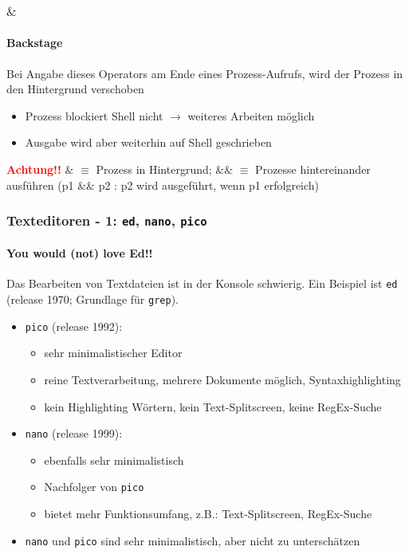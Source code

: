 \documentclass[12pt,utf8]{beamer}
\begin{document}
\begin{frame}
\frametitle{$\&$}
\framesubtitle{Backstage}
Bei Angabe dieses Operators am Ende eines Prozess-Aufrufs, wird der Prozess in den Hintergrund verschoben
\begin{itemize}
	\item Prozess blockiert Shell nicht $\to$ weiteres Arbeiten möglich
	\item Ausgabe wird aber weiterhin auf Shell geschrieben
\end{itemize}
\textbf{\textcolor{red}{Achtung!!}} $\&$ $\equiv$ Prozess in Hintergrund; $\&\&$ $\equiv$ Prozesse hintereinander ausführen (p1 $\&\&$ p2 : p2 wird ausgeführt, wenn p1 erfolgreich)
\end{frame}

\begin{frame}
\frametitle{Texteditoren - 1: \texttt{ed}, \texttt{nano}, \texttt{pico}}
\framesubtitle{\textcolor{ownDarkOr}{You would (not) love Ed!!}}
Das Bearbeiten von Textdateien ist in der Konsole schwierig. Ein Beispiel ist \texttt{ed} (release 1970; Grundlage für \texttt{grep}).
\begin{itemize}
	\item \texttt{pico} (release 1992):
	\begin{itemize}[<+->]
		\item {\scriptsize sehr minimalistischer Editor}
		\item {\scriptsize reine Textverarbeitung, mehrere Dokumente möglich, Syntaxhighlighting}
		\item {\scriptsize kein Highlighting Wörtern, kein Text-Splitscreen, keine RegEx-Suche}
	\end{itemize}
	\item \texttt{nano} (release 1999):
	\begin{itemize}[<+->]
		\item {\scriptsize ebenfalls sehr minimalistisch}
		\item {\scriptsize Nachfolger von \texttt{pico}}
		\item {\scriptsize bietet mehr Funktionsumfang, z.B.: Text-Splitscreen, RegEx-Suche}
	\end{itemize}
	\item \texttt{nano} und \texttt{pico} sind sehr minimalistisch, aber nicht zu unterschätzen
\end{itemize}
\end{frame}
\end{document}
